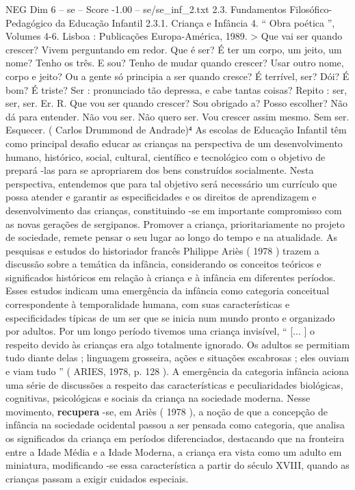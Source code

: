 \begin{textsample}{NEG Dim 6 – se – Score -1.00 – se/se\_inf\_2.txt}  \label{ex:f6_neg_241}
2.3.
Fundamentos Filosófico-Pedagógico da Educação Infantil 2.3.1.
Criança e Infância 4. “ Obra poética ”, Volumes 4-6.
Lisboa : Publicações Europa-América, 1989. > Que vai ser quando crescer?
Vivem perguntando em redor.
Que é ser?
É ter um corpo, um jeito, um nome?
Tenho os três.
E sou?
Tenho de mudar quando crescer?
Usar outro nome, corpo e jeito?
Ou a gente só principia a ser quando cresce?
É terrível, ser?
Dói?
É bom?
É triste?
Ser : pronunciado tão depressa, e cabe tantas coisas?
Repito : ser, ser, ser.
Er.
R.
Que vou ser quando crescer?
Sou obrigado a?
Posso escolher?
Não dá para entender.
Não vou ser.
Não quero ser.
Vou crescer assim mesmo.
Sem ser.
Esquecer. ( Carlos Drummond de Andrade)⁴ As escolas de Educação Infantil têm como principal desafio educar as crianças na perspectiva de um desenvolvimento humano, histórico, social, cultural, científico e tecnológico com o objetivo de prepará -las para se apropriarem dos bens construídos socialmente.
Nesta perspectiva, entendemos que para tal objetivo será necessário um currículo que possa atender e garantir as especificidades e os direitos de aprendizagem e desenvolvimento das crianças, constituindo -se em importante compromisso com as novas gerações de sergipanos.
Promover a criança, prioritariamente no projeto de sociedade, remete pensar o seu lugar ao longo do tempo e na atualidade.
As pesquisas e estudos do historiador francês Philippe Ariès ( 1978 ) trazem a discussão sobre a temática da infância, considerando os conceitos teóricos e significados históricos em relação à criança e à infância em diferentes períodos.
Esses estudos indicam uma emergência da infância como categoria conceitual correspondente à temporalidade humana, com suas características e especificidades típicas de um ser que se inicia num mundo pronto e organizado por adultos.
Por um longo período tivemos uma criança invisível, “ [... ] o respeito devido às crianças era algo totalmente ignorado.
Os adultos se permitiam tudo diante delas ; linguagem grosseira, ações e situações escabrosas ; eles ouviam e viam tudo ” ( ARIES, 1978, p. 128 ).
A emergência da categoria infância aciona uma série de discussões a respeito das características e peculiaridades biológicas, cognitivas, psicológicas e sociais da criança na sociedade moderna.
Nesse movimento, \textbf{recupera} -se, em Ariès ( 1978 ), a noção de que a concepção de infância na sociedade ocidental passou a ser pensada como categoria, que analisa os significados da criança em períodos diferenciados, destacando que na fronteira entre a Idade Média e a Idade Moderna, a criança era vista como um adulto em miniatura, modificando -se essa característica a partir do século XVIII, quando as crianças passam a exigir cuidados especiais.

\end{textsample}
